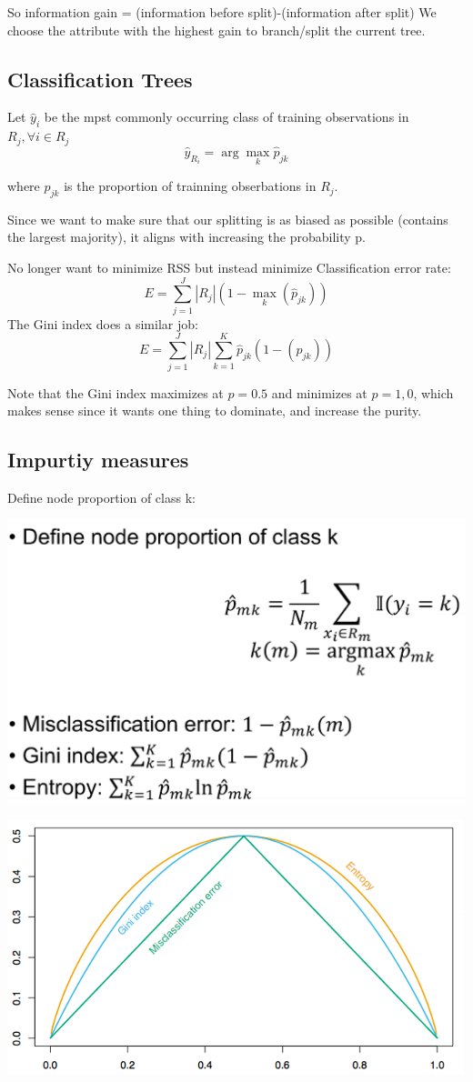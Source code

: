 \documentclass[letterpaper,12pt]{article}
\begin{document}
So information gain = (information before split)-(information after split) We choose the attribute with the highest gain to branch/split the current tree.

\subsection{Classification Trees}

Let $\hat{y}_i$ be the mpst commonly occurring class of training observations in $R_j,\forall i \in R_j$
\[
\hat{y}_{R_i}=\arg \max_k \hat{p}_{jk}    
\]

where $\hat{p}_{jk}$ is the proportion of trainning obserbations in $R_j$. 

Since we want to make sure that our splitting is as biased as possible (contains the largest majority), it aligns with increasing the probability p. 

No longer want to minimize RSS but instead minimize Classification error rate:
\[
E = \sum_{j=1}^J|R_j|(1-\max_k(\hat{p}_{jk}))    
\]
The Gini index does a similar job: 
\[
    E = \sum_{j=1}^J|R_j|   \sum_{k=1}^{K}  \hat{p}_{jk}(1-(\hat{p}_{jk}))   
\]

Note that the Gini index maximizes at $p=0.5$ and minimizes at $p=1,0$, which makes sense since it wants one thing to dominate, and increase the purity. 

\subsection{Impurtiy measures}
Define node proportion of class k:

\includegraphics*{./Image/Impurity measuring equations.png}

\includegraphics*{./Image/Impurity Measure Graph.png}
\end{document}
